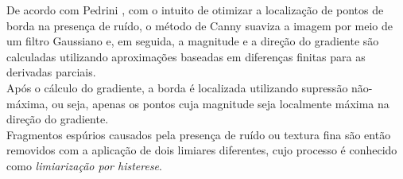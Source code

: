 \documentclass[12pt]{article}
\begin{document}
\begin{itemize}
\begin{itemize}
\begin{enumerate}[label*=\arabic*.]
    De acordo com Pedrini \cite{pedrini2008analise}, com o intuito de otimizar a localização de pontos de borda na presença de ruído, o método de Canny suaviza a imagem por meio de um filtro Gaussiano e, em seguida, a magnitude e a direção do gradiente são calculadas utilizando aproximações baseadas em diferenças finitas para as derivadas parciais.\\
    Após o cálculo do gradiente, a borda é localizada utilizando supressão não-máxima, ou seja, apenas os pontos cuja magnitude seja localmente 
    máxima na direção do gradiente.\\
    Fragmentos espúrios causados pela presença de ruído ou textura fina são então removidos com a aplicação de dois limiares diferentes,
    cujo processo é conhecido como \textit{limiarização por histerese}.
    \\
\end{enumerate}

\end{itemize}
\end{itemize}
\clearpage

\printbibliography
\end{document}
